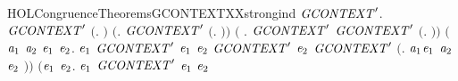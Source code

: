 \newcommand{\HOLCongruenceTheoremsGCONTEXTXXrules}{\UseVerbatim{HOLCongruenceTheoremsGCONTEXTXXrules}}
\begin{SaveVerbatim}{HOLCongruenceTheoremsGCONTEXTXXstrongind}
\HOLTokenTurnstile{} \HOLSymConst{\HOLTokenForall{}}\ensuremath{\HOLBoundVar{GCONTEXT}\sp{\prime}}.
       \ensuremath{\HOLBoundVar{GCONTEXT}\sp{\prime}} \ensuremath{(}\HOLTokenLambda{}. \ensuremath{)} \HOLSymConst{\HOLTokenConj{}} \ensuremath{(}\HOLSymConst{\HOLTokenForall{}}. \ensuremath{\HOLBoundVar{GCONTEXT}\sp{\prime}} \ensuremath{(}\HOLTokenLambda{}. \ensuremath{)}\ensuremath{)} \HOLSymConst{\HOLTokenConj{}}
       \ensuremath{(}\HOLSymConst{\HOLTokenForall{}} .   \HOLSymConst{\HOLTokenConj{}} \ensuremath{\HOLBoundVar{GCONTEXT}\sp{\prime}}  \HOLSymConst{\HOLTokenImp{}} \ensuremath{\HOLBoundVar{GCONTEXT}\sp{\prime}} \ensuremath{(}\HOLTokenLambda{}. \HOLSymConst{\ensuremath{\ldotp}} \ensuremath{)}\ensuremath{)} \HOLSymConst{\HOLTokenConj{}}
       \ensuremath{(}\HOLSymConst{\HOLTokenForall{}}\ensuremath{\HOLBoundVar{a}\sb{\mathrm{1}}} \ensuremath{\HOLBoundVar{a}\sb{\mathrm{2}}} \ensuremath{\HOLBoundVar{e}\sb{\mathrm{1}}} \ensuremath{\HOLBoundVar{e}\sb{\mathrm{2}}}.
             \ensuremath{\HOLBoundVar{e}\sb{\mathrm{1}}} \HOLSymConst{\HOLTokenConj{}} \ensuremath{\HOLBoundVar{GCONTEXT}\sp{\prime}} \ensuremath{\HOLBoundVar{e}\sb{\mathrm{1}}} \HOLSymConst{\HOLTokenConj{}}  \ensuremath{\HOLBoundVar{e}\sb{\mathrm{2}}} \HOLSymConst{\HOLTokenConj{}}
            \ensuremath{\HOLBoundVar{GCONTEXT}\sp{\prime}} \ensuremath{\HOLBoundVar{e}\sb{\mathrm{2}}} \HOLSymConst{\HOLTokenImp{}}
            \ensuremath{\HOLBoundVar{GCONTEXT}\sp{\prime}} \ensuremath{(}\HOLTokenLambda{}. \ensuremath{\HOLBoundVar{a}\sb{\mathrm{1}}}\HOLSymConst{\ensuremath{\ldotp}}\ensuremath{\HOLBoundVar{e}\sb{\mathrm{1}}}  \HOLSymConst{\ensuremath{+}} \ensuremath{\HOLBoundVar{a}\sb{\mathrm{2}}}\HOLSymConst{\ensuremath{\ldotp}}\ensuremath{\HOLBoundVar{e}\sb{\mathrm{2}}} \ensuremath{)}\ensuremath{)} \HOLSymConst{\HOLTokenConj{}}
       \ensuremath{(}\HOLSymConst{\HOLTokenForall{}}\ensuremath{\HOLBoundVar{e}\sb{\mathrm{1}}} \ensuremath{\HOLBoundVar{e}\sb{\mathrm{2}}}.
             \ensuremath{\HOLBoundVar{e}\sb{\mathrm{1}}} \HOLSymConst{\HOLTokenConj{}} \ensuremath{\HOLBoundVar{GCONTEXT}\sp{\prime}} \ensuremath{\HOLBoundVar{e}\sb{\mathrm{1}}} \HOLSymConst{\HOLTokenConj{}}  \ensuremath{\HOLBoundVar{e}\sb{\mathrm{2}}} \HOLSymConst{\HOLTokenConj{}}

\end{SaveVerbatim}
